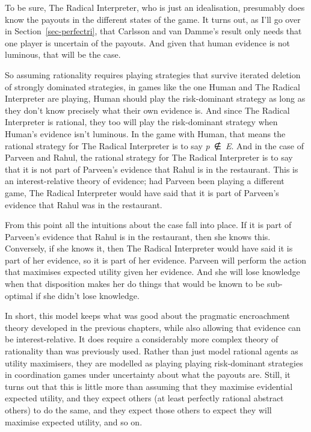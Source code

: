 \documentclass[
  12pt,
  letterpaper,
]{scrbook}
\begin{document}
To be sure, The Radical Interpreter, who is just an idealisation,
presumably does know the payouts in the different states of the game. It
turns out, as I'll go over in Section~\ref{sec-perfectri}, that Carlsson
and van Damme's result only needs that one player is uncertain of the
payouts. And given that human evidence is not luminous, that will be the
case.

So assuming rationality requires playing strategies that survive
iterated deletion of strongly dominated strategies, in games like the
one Human and The Radical Interpreter are playing, Human should play the
risk-dominant strategy as long as they don't know precisely what their
own evidence is. And since The Radical Interpreter is rational, they too
will play the risk-dominant strategy when Human's evidence isn't
luminous. In the game with Human, that means the rational strategy for
The Radical Interpreter is to say \emph{p}~∉~\emph{E}. And in the case
of Parveen and Rahul, the rational strategy for The Radical Interpreter
is to say that it is not part of Parveen's evidence that Rahul is in the
restaurant. This is an interest-relative theory of evidence; had Parveen
been playing a different game, The Radical Interpreter would have said
that it is part of Parveen's evidence that Rahul was in the restaurant.

From this point all the intuitions about the case fall into place. If it
is part of Parveen's evidence that Rahul is in the restaurant, then she
knows this. Conversely, if she knows it, then The Radical Interpreter
would have said it is part of her evidence, so it is part of her
evidence. Parveen will perform the action that maximises expected
utility given her evidence. And she will lose knowledge when that
disposition makes her do things that would be known to be sub-optimal if
she didn't lose knowledge.

In short, this model keeps what was good about the pragmatic
encroachment theory developed in the previous chapters, while also
allowing that evidence can be interest-relative. It does require a
considerably more complex theory of rationality than was previously
used. Rather than just model rational agents as utility maximisers, they
are modelled as playing playing risk-dominant strategies in coordination
games under uncertainty about what the payouts are. Still, it turns out
that this is little more than assuming that they maximise evidential
expected utility, and they expect others (at least perfectly rational
abstract others) to do the same, and they expect those others to expect
they will maximise expected utility, and so on.
\end{document}
